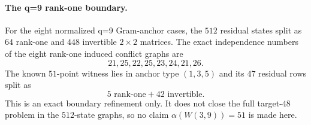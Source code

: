 \paragraph{The q=9 rank-one boundary.}
For the eight normalized q=9 Gram-anchor cases, the $512$ residual states split as $64$ rank-one and $448$ invertible $2\times2$ matrices.  The exact independence numbers of the eight rank-one induced conflict graphs are
\[
  \boxed{21,25,22,25,23,24,21,26}.
\]
The known $51$-point witness lies in anchor type $(1,3,5)$ and its $47$ residual rows split as
\[
  \boxed{5\text{ rank-one}+42\text{ invertible}}.
\]
This is an exact boundary refinement only.  It does not close the full target-$48$ problem in the $512$-state graphs, so no claim $\alpha(W(3,9))=51$ is made here.
